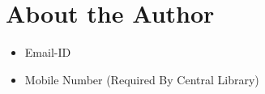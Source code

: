 \chapter{About the Author}
\lipsum[58]


\begin{itemize}
	\item Email-ID
	\item Mobile Number (Required By Central Library)
\end{itemize}

